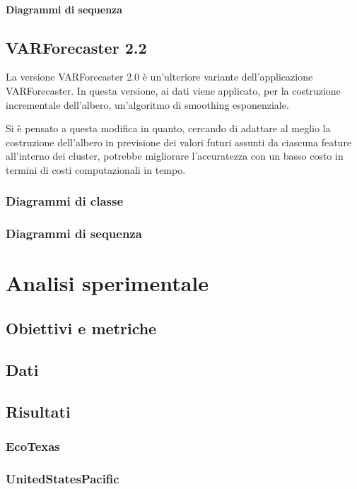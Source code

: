 \documentclass[12pt,a4paper,twoside,openright]{book}
\begin{document}
\subsubsection{Diagrammi di sequenza}

\newpage
\section{VARForecaster 2.2}
La versione VARForecaster 2.0 è un'ulteriore variante dell'applicazione VARForecaster. In questa versione, ai dati viene applicato, per la costruzione incrementale dell'albero, un'algoritmo di smoothing esponenziale. 

Si è pensato a questa modifica in quanto, cercando di adattare al meglio la costruzione dell'albero in previsione dei valori futuri assunti da ciascuna feature all'interno dei cluster, potrebbe migliorare l'accuratezza con un basso costo in termini di costi computazionali in tempo.
\newpage
\subsection{Diagrammi di classe}
\newpage
\subsection{Diagrammi di sequenza}

\chapter{Analisi sperimentale}
\newpage
\section{Obiettivi e metriche}
\newpage
\section{Dati}
\newpage
\section{Risultati}
\newpage
\subsection{EcoTexas}
\newpage
\subsection{UnitedStatesPacific}
\end{document}
